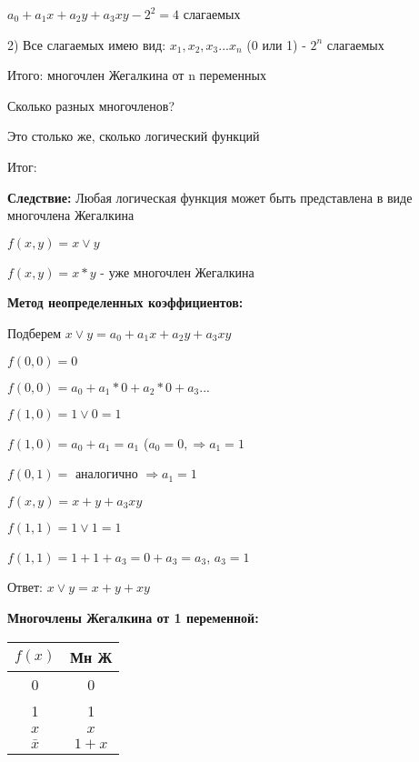 \documentclass[russian]{lecture-notes}
\begin{document}
\begin{sloppypar}
\begin{proposition}
\begin{example}
    $a_{0} + a_{1}x + a_{2}y+a_{3}xy - 2^2 = 4$ слагаемых
    
    2) Все слагаемых имею вид: $x_{1},x_{2},x_{3}...x_{n}$ (0 или 1) - $2^n$ слагаемых
    
    Итого: многочлен Жегалкина от n переменных 
    \end{example}
    
    
    \begin{problem}
    Сколько разных многочленов?
    
    Это столько же, сколько логический функций
    
    Итог: 
    
    \textbf{Следствие:} Любая логическая функция может быть представлена в виде многочлена Жегалкина
    
    \end{problem}
    
    \begin{example}
    
        $f(x,y) = x \lor y$
        
        $f(x,y) = x*y$ - уже многочлен Жегалкина
        
        \textbf{Метод неопределенных коэффициентов:}
        
        
        Подберем $x \lor y = a_{0} + a_{1}x + a_{2}y + a_{3}xy$
        
        $f(0,0) = 0$
        
        $f(0,0) = a_{0} + a_{1}*0 + a_{2}*0 + a_{3}...$
        
        $f(1,0) = 1 \lor 0 = 1$
        
        $f(1,0) = a_{0} + a_{1} = a_{1}$ ($a_{0} = 0, \Rightarrow a_{1} = 1$
        
        $f(0,1) =$ аналогично $\Rightarrow a_{1} = 1$
        
        $f(x,y) = x+y + a_{3}xy$
        
        $f(1,1) = 1 \lor 1 = 1$
        
        $f(1,1) = 1 + 1 + a_{3} = 0 + a_{3} = a_{3}$, $a_{3}=1$
        
        Ответ: $x\lor y = x+y+xy$
        
    \end{example}

\end{proposition}

\textbf{Многочлены Жегалкина от 1 переменной:}

\begin{table}[h!]
	\centering
	\begin{tabular}{|c|c|}
		\hline
		$f(x)$ & Мн Ж  \\ \hline
		0    		   & 0     \\ \hline
		1    		   & 1     \\ \hline
		$x$          & $x$     \\ \hline
		$\bar{x}$ & $1 + x$ \\ \hline
	\end{tabular}
\end{table}


\end{sloppypar}
\end{document}
